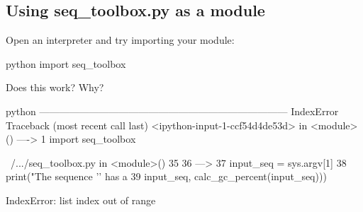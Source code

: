\documentclass[aspectratio=1610,slidestop]{beamer}
\begin{document}
\subsection{Using seq\_toolbox.py as a module}
\begin{pframe}
 Open an interpreter and try importing your module:
 \begin{ipython}
  \begin{pythonin}{python}
import seq_toolbox
  \end{pythonin}
 \end{ipython}
Does this work? Why?
\end{pframe}

\begin{pframe}
 \begin{ipython}
  \begin{pythonerr}{python}
---------------------------------------------------------------------------
IndexError                                Traceback (most recent call last)
<ipython-input-1-ccf54d4de53d> in <module>()
----> 1 import seq_toolbox

~/.../seq_toolbox.py in <module>()
     35
     36
---> 37 input_seq = sys.argv[1]
     38 print("The sequence '{}' has a %
     39           input_seq, calc_gc_percent(input_seq)))

IndexError: list index out of range
  \end{pythonerr}
 \end{ipython}
\end{pframe}
\end{document}
